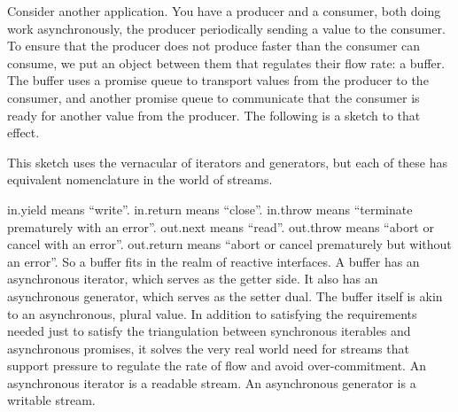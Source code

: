 Consider another application. You have a producer and a consumer, both doing work asynchronously, the producer periodically sending a value to the consumer. To ensure that the producer does not produce faster than the consumer can consume, we put an object between them that regulates their flow rate: a buffer. The buffer uses a promise queue to transport values from the producer to the consumer, and another promise queue to communicate that the consumer is ready for another value from the producer. The following is a sketch to that effect.

This sketch uses the vernacular of iterators and generators, but each of these has equivalent nomenclature in the world of streams.

in.yield means “write”.
in.return means “close”.
in.throw means “terminate prematurely with an error”.
out.next means “read”.
out.throw means “abort or cancel with an error”.
out.return means “abort or cancel prematurely but without an error”.
So a buffer fits in the realm of reactive interfaces. A buffer has an asynchronous iterator, which serves as the getter side. It also has an asynchronous generator, which serves as the setter dual. The buffer itself is akin to an asynchronous, plural value. In addition to satisfying the requirements needed just to satisfy the triangulation between synchronous iterables and asynchronous promises, it solves the very real world need for streams that support pressure to regulate the rate of flow and avoid over-commitment. An asynchronous iterator is a readable stream. An asynchronous generator is a writable stream.

